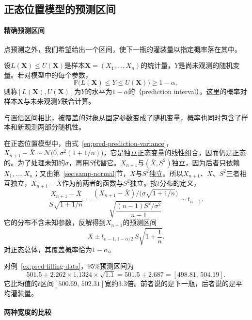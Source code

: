 \subsection{正态位置模型的预测区间}

\paragraph{精确预测区间}

点预测之外，我们希望给出一个区间，使下一瓶的灌装量以指定概率落在其中。

\begin{definition}[预测区间]
\label{def:pred-prediction-interval}
设$L(\bm X)\leq U(\bm X)$是样本$\bm X=(X_1,\dots,X_n)$的统计量，$Y$是尚未观测的随机变量。若对模型中的每个参数，
\[
 \mathbb P\bigl(L(\bm X)\leq Y\leq U(\bm X)\bigr)\geq1-\alpha,
\]
则称$[L(\bm X),U(\bm X)]$为$Y$的水平为$1-\alpha$的（prediction interval）。这里的概率对样本$\bm X$与未来观测$Y$联合计算。
\end{definition}

与置信区间相比，被覆盖的对象从固定参数变成了随机变量，概率也同时包含了样本和新观测两部分随机性。

在正态位置模型中，由式~\eqref{eq:pred-prediction-variance}，$X_{n+1}-\bar X\sim\mathcal N\bigl(0,\sigma^2(1+1/n)\bigr)$，它是独立正态变量的线性组合，因而仍是正态的。为了处理未知的$\sigma$，再用$S$代替它。$X_{n+1}$与$(\bar X,S^2)$独立，因为后者只依赖$X_1,\dots,X_n$；又由第~\ref{sec:samp-normal}节，$\bar X$与$S^2$独立。所以$X_{n+1}$、$\bar X$、$S^2$三者相互独立，$X_{n+1}-\bar X$作为前两者的函数与$S^2$独立。按$t$分布的定义，
\[
 \frac{X_{n+1}-\bar X}{S\sqrt{1+1/n}}
 =\frac{(X_{n+1}-\bar X)\big/\bigl(\sigma\sqrt{1+1/n}\bigr)}{\sqrt{\dfrac{(n-1)S^2/\sigma^2}{n-1}}}
 \sim t_{n-1}.
\]
它的分布不含未知参数，反解得到$X_{n+1}$的预测区间
\begin{equation}
 \bar X\pm t_{n-1,1-\alpha/2}\,S\sqrt{1+\frac1n}.
 \label{eq:pred-normal-prediction-interval}
\end{equation}
对正态总体，其覆盖概率恰为$1-\alpha$。

\begin{example}[下一瓶的预测区间]
\label{ex:pred-filling-prediction}
对例~\ref{ex:pred-filling-data}，$95\%$预测区间为
\[
 501.5\pm2.262\times1.1324\times\sqrt{1.1}=501.5\pm2.687=[498.81,\,504.19].
\]
它比均值的$t$区间$[500.69,\,502.31]$宽约$3.3$倍。前者说的是下一瓶，后者说的是平均灌装量。
\end{example}

\paragraph{两种宽度的比较}

